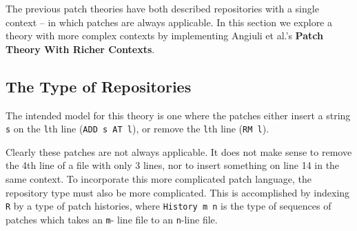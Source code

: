 The previous patch theories have both described repositories with a single context --
in which patches are always applicable. In this section we explore a theory with more
complex contexts by implementing Angiuli et al.'s \textbf{Patch Theory With Richer Contexts}.

\subsection{The Type of Repositories}
The intended model for this theory is one where the patches either insert a string \texttt{s} on the
\texttt{l}th line (\texttt{ADD s AT l}), or remove the \texttt{l}th line (\texttt{RM l}).

Clearly these patches are not always applicable. It does not make sense to remove the 4th line of a file
with only 3 lines, nor to insert something on line 14 in the same context.
To incorporate this more complicated patch language, the repository type must also be more complicated.
This is accomplished by indexing \texttt{R} by a type
of patch histories, where \texttt{History m n} is the type of sequences of patches which takes an \texttt{m}-
line file to an \texttt{n}-line file.

